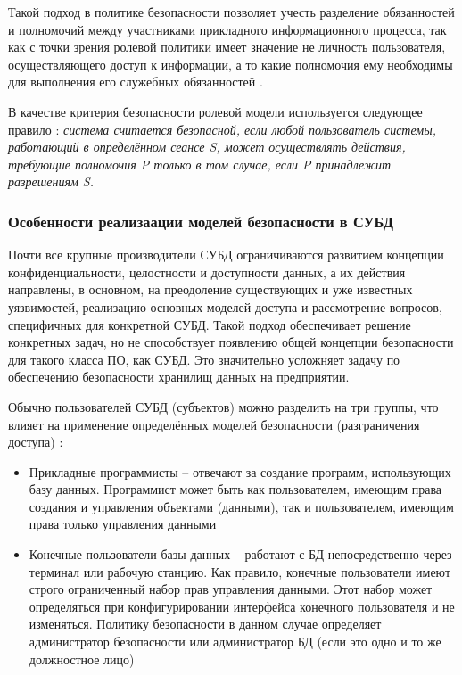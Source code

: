 {Такой подход в политике безопасности позволяет учесть разделение обязанностей и полномочий между 
участниками прикладного информационного процесса, так как с точки зрения ролевой политики имеет 
значение не личность пользователя, осуществляющего доступ к информации, а то какие полномочия ему 
необходимы для выполнения его служебных обязанностей \autocite{Zegzhda}. 

В качестве критерия безопасности ролевой модели используется следующее правило \autocite{Zegzhda}: 
\textit{система считается безопасной, если любой пользователь системы, работающий в определённом 
сеансе S, может осуществлять действия, требующие полномочия P только в том случае, если P принадлежит 
разрешениям S.}

\subsubsection{Особенности реализаации моделей безопасности в СУБД}

Почти все крупные производители СУБД ограничиваются развитием концепции конфиденциальности, целостности 
и доступности данных, а их действия направлены, в основном, на преодоление существующих и уже известных 
уязвимостей, реализацию основных моделей доступа и рассмотрение вопросов, специфичных для конкретной СУБД. 
Такой подход обеспечивает решение конкретных задач, но не способствует появлению общей концепции 
безопасности для такого класса ПО, как СУБД. Это значительно усложняет задачу по обеспечению безопасности 
хранилищ данных на предприятии.

Обычно пользователей СУБД (субъектов) можно разделить на три группы, что влияет на применение определённых 
моделей безопасности (разграничения доступа) \autocite{CitForumSafeDB}:
\begin{itemize}
    \item Прикладные программисты -- отвечают за создание программ, использующих базу данных. Программист 
    может быть как пользователем, имеющим права создания и управления объектами (данными), так и пользователем, 
    имеющим права только управления данными

    \item Конечные пользователи базы данных -- работают с БД непосредственно через терминал или рабочую станцию. 
    Как правило, конечные пользователи имеют строго ограниченный набор прав управления данными. Этот набор 
    может определяться при конфигурировании интерфейса конечного пользователя и не изменяться. Политику 
    безопасности в данном случае определяет администратор безопасности или администратор БД (если это одно и 
    то же должностное лицо)


\end{itemize}}

